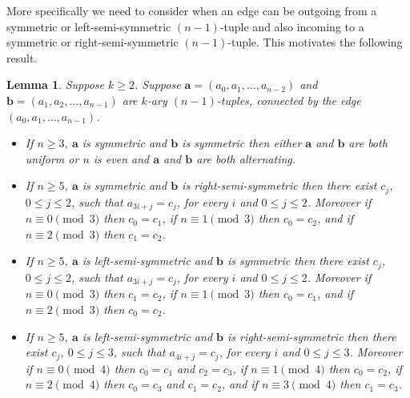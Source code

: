 \documentclass[a4paper,11pt]{article}
\newtheorem{lemma}{Lemma}[section]
\begin{document}
More specifically we need to consider when an edge can be outgoing from a symmetric or
left-semi-symmetric $(n-1)$-tuple and also incoming to a symmetric or right-semi-symmetric
$(n-1)$-tuple.  This motivates the following result.

\begin{lemma}  \label{lemma:constraint-interactions}
Suppose $k\geq2$.  Suppose $\mathbf{a}=(a_0,a_1,\dots,a_{n-2})$ and
$\mathbf{b}=(a_1,a_2,\dots,a_{n-1})$ are $k$-ary $(n-1)$-tuples, connected by the edge
$(a_0,a_1,\dots,a_{n-1})$.
\begin{itemize}
\item[i)] If $n\geq3$, $\mathbf{a}$ is symmetric and $\mathbf{b}$ is symmetric then either
    $\mathbf{a}$ and $\mathbf{b}$ are both uniform or $n$ is even and $\mathbf{a}$ and
    $\mathbf{b}$ are both alternating.
\item[ii)] If $n\geq5$, $\mathbf{a}$ is symmetric and $\mathbf{b}$ is right-semi-symmetric then
    there exist $c_j$, $0\leq j\leq2$, such that $a_{3i+j}=c_j$, for every $i$ and $0\leq j\leq
    2$.  Moreover if $n\equiv0\pmod3$ then $c_0=c_1$, if $n\equiv1\pmod3$ then $c_0=c_2$, and
    if $n\equiv2\pmod3$ then $c_1=c_2$.
\item[iii)] If $n\geq5$, $\mathbf{a}$ is left-semi-symmetric and $\mathbf{b}$ is symmetric then
    there exist $c_j$, $0\leq j\leq2$, such that $a_{3i+j}=c_j$, for every $i$ and $0\leq j\leq
    2$.  Moreover if $n\equiv0\pmod3$ then $c_1=c_2$, if $n\equiv1\pmod3$ then $c_0=c_1$, and
    if $n\equiv2\pmod3$ then $c_0=c_2$.
\item[iv)] If $n\geq5$, $\mathbf{a}$ is left-semi-symmetric and $\mathbf{b}$ is
    right-semi-symmetric then there exist $c_j$, $0\leq j\leq3$, such that $a_{4i+j}=c_j$, for
    every $i$ and $0\leq j\leq 3$. Moreover if $n\equiv0\pmod4$ then $c_0=c_1$ and $c_2=c_3$,
    if $n\equiv1\pmod4$ then $c_0=c_2$, if $n\equiv2\pmod4$ then $c_0=c_3$ and $c_1=c_2$, and
    if $n\equiv3\pmod4$ then $c_1=c_3$.
\end{itemize}
\end{lemma}
\end{document}
